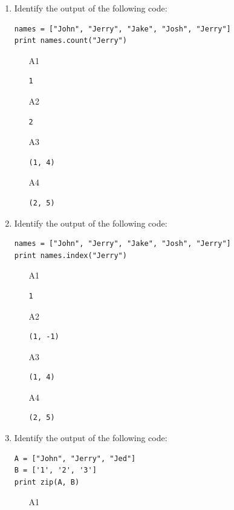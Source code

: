 \begin{enumerate}
\begin{enumerate}
\end{enumerate}
\item Identify the output of the following code:
\begin{verbatim}
names = ["John", "Jerry", "Jake", "Josh", "Jerry"]
print names.count("Jerry")
\end{verbatim}
\begin{enumerate}
\item[A1] 
\begin{verbatim}
1
\end{verbatim}
\item[A2] 
\begin{verbatim}
2
\end{verbatim}
\item[A3] 
\begin{verbatim}
(1, 4)
\end{verbatim}
\item[A4] 
\begin{verbatim}
(2, 5)
\end{verbatim}
\end{enumerate}
\item Identify the output of the following code:
\begin{verbatim}
names = ["John", "Jerry", "Jake", "Josh", "Jerry"]
print names.index("Jerry")
\end{verbatim}
\begin{enumerate}
\item[A1] 
\begin{verbatim}
1
\end{verbatim}
\item[A2] 
\begin{verbatim}
(1, -1)
\end{verbatim}
\item[A3] 
\begin{verbatim}
(1, 4)
\end{verbatim}
\item[A4] 
\begin{verbatim}
(2, 5)
\end{verbatim}
\end{enumerate}
\item Identify the output of the following code:
\begin{verbatim}
A = ["John", "Jerry", "Jed"]
B = ['1', '2', '3']
print zip(A, B)
\end{verbatim}
\begin{enumerate}
\item[A1] 
\begin{verbatim}

\end{verbatim}
\end{enumerate}
\end{enumerate}

